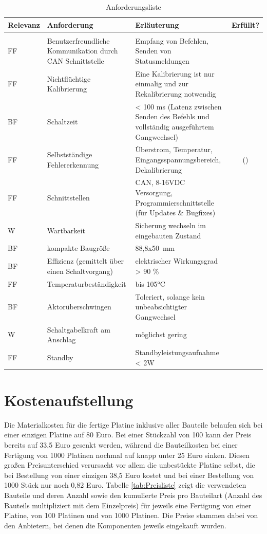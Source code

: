 \begin{table}[h]
	\centering
		\begin{tabular}{l|p{5cm}|p{7cm}|c}
			\textbf{Relevanz} & \textbf{Anforderung} & \textbf{Erläuterung} & Erfüllt?\\ \hline
			& &\\
			FF & Benutzerfreundliche Kommunikation durch CAN Schnittstelle & Empfang von Befehlen, Senden von Statusmeldungen & \checkmark\\ \hline
			FF & Nichtflüchtige Kalibrierung & Eine Kalibrierung ist nur einmalig und zur Rekalibrierung notwendig& \checkmark\\ \hline
			BF & Schaltzeit & < 100 ms (Latenz zwischen Senden des Befehls und vollständig ausgeführtem Gangwechsel)& \checkmark\\ \hline
			FF & Selbstständige Fehlererkennung & Überstrom, Temperatur, Eingangsspannungsbereich, Dekalibrierung& (\checkmark) \\ \hline
			FF & Schnittstellen & CAN, 8-16VDC Versorgung, Programmierschnittstelle (für Updates \& Bugfixes)& \checkmark \\ \hline
			W & Wartbarkeit & Sicherung wechseln im eingebauten Zustand& \checkmark\\ \hline
			BF & kompakte Baugröße & 88,8x\SI{50}{mm}&\checkmark \\ \hline
			BF & Effizienz (gemittelt über einen Schaltvorgang) & elektrischer Wirkungsgrad > 90 \% & \\ \hline
			FF & Temperaturbeständigkeit & bis 105°C& \checkmark \\ \hline
			BF & Aktorüberschwingen & Toleriert, solange kein unbeabsichtigter Gangwechsel& \checkmark
			\\ \hline
			W & Schaltgabelkraft am Anschlag & möglichst gering& \checkmark \\ \hline
			FF & Standby & Standbyleistungsaufnahme < 2W& \checkmark \\ \hline
		\end{tabular}
	\caption{Anforderungsliste}
	\label{tab:Anforderungsliste2}
\end{table}
\section{Kostenaufstellung}
Die Materialkosten für die fertige Platine inklusive aller Bauteile belaufen sich bei einer einzigen Platine auf 80 Euro. Bei einer Stückzahl von 100 kann der Preis bereits auf 33,5 Euro gesenkt werden, während die Bauteilkosten bei einer Fertigung von 1000 Platinen nochmal auf knapp unter 25 Euro sinken. Diesen großen Preisunterschied verursacht vor allem die unbestückte Platine selbst, die bei Bestellung von einer einzigen 38,5 Euro kostet und bei einer Bestellung von 1000 Stück nur noch 0,82 Euro. Tabelle \ref{tab:Preisliste} zeigt die verwendeten Bauteile und deren Anzahl sowie den kumulierte Preis pro Bauteilart (Anzahl des Bauteils multipliziert mit dem Einzelpreis) für jeweils eine Fertigung von einer Platine, von 100 Platinen und von 1000 Platinen. Die Preise stammen dabei von den Anbietern, bei denen die Komponenten jeweils eingekauft wurden.

